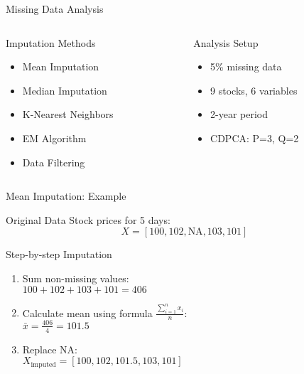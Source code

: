\documentclass{beamer}
\begin{document}
\begin{frame}{Missing Data Analysis}
    \begin{columns}
        \begin{column}{0.48\textwidth}
            \begin{block}{Imputation Methods}
                \begin{itemize}
                    \item Mean Imputation
                    \item Median Imputation
                    \item K-Nearest Neighbors
                    \item EM Algorithm
                    \item Data Filtering
                \end{itemize}
            \end{block}
        \end{column}
        \begin{column}{0.48\textwidth}
            \begin{block}{Analysis Setup}
                \begin{itemize}
                    \item 5\% missing data
                    \item 9 stocks, 6 variables
                    \item 2-year period
                    \item CDPCA: P=3, Q=2
                \end{itemize}
            \end{block}
        \end{column}
    \end{columns}
\end{frame}

\begin{frame}{Mean Imputation: Example}
   \begin{block}{Original Data}
       Stock prices for 5 days:
       \[
       X = [100, 102, \text{NA}, 103, 101]
       \]
   \end{block}

   \begin{block}{Step-by-step Imputation}
       \begin{enumerate}
           \item Sum non-missing values:\\
           $100 + 102 + 103 + 101 = 406$
           \item Calculate mean using formula $\frac{\sum_{i=1}^{n} x_i}{n}$:\\
           $\bar{x} = \frac{406}{4} = 101.5$
           \item Replace NA:\\
           $X_{\text{imputed}} = [100, 102, \mathbf{101.5}, 103, 101]$
       \end{enumerate}
   \end{block}
\end{frame}
\end{document}
